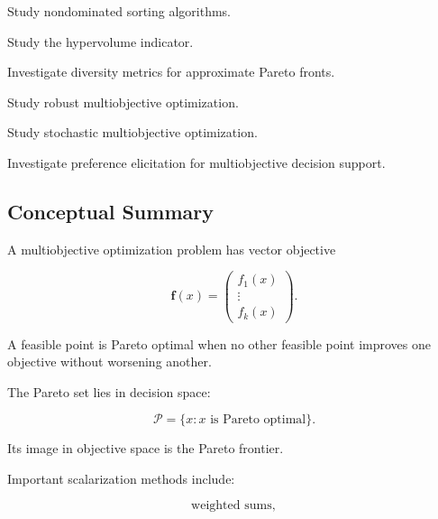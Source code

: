 \begin{exercise}[4]
Study nondominated sorting algorithms.
\end{exercise}

\begin{exercise}[4]
Study the hypervolume indicator.
\end{exercise}

\begin{exercise}[4]
Investigate diversity metrics for approximate Pareto fronts.
\end{exercise}

\begin{exercise}[4]
Study robust multiobjective optimization.
\end{exercise}

\begin{exercise}[4]
Study stochastic multiobjective optimization.
\end{exercise}

\begin{exercise}[4]
Investigate preference elicitation for multiobjective decision support.
\end{exercise}

\subsection{Conceptual Summary}
\label{subsec:multiobjective-summary}

A multiobjective optimization problem has vector objective

\[
\boxed{
\mathbf{f}(x)
=
\begin{pmatrix}
f_1(x)\\
\vdots\\
f_k(x)
\end{pmatrix}.
}
\]

A feasible point is Pareto optimal when no other feasible point improves
one objective without worsening another.

The Pareto set lies in decision space:

\[
\boxed{
\mathcal{P}
=
\{
x:
x\text{ is Pareto optimal}
\}.
}
\]

Its image in objective space is the Pareto frontier.

Important scalarization methods include:

\[
\boxed{
\text{weighted sums},
}
\]

